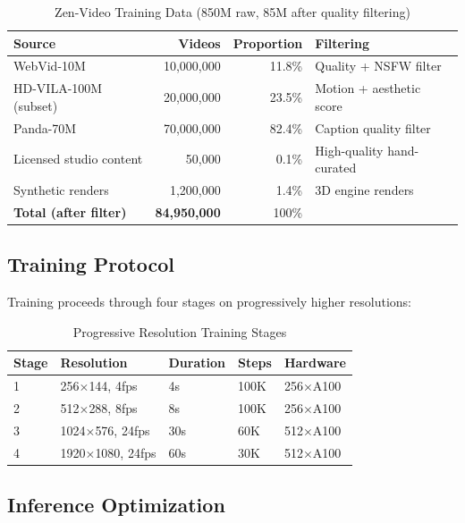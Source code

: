\documentclass[11pt,a4paper]{article}
\begin{document}
\begin{table}[H]
\centering
\begin{tabular}{lrrl}
\toprule
\textbf{Source} & \textbf{Videos} & \textbf{Proportion} & \textbf{Filtering} \\
\midrule
WebVid-10M & 10,000,000 & 11.8\% & Quality + NSFW filter \\
HD-VILA-100M (subset) & 20,000,000 & 23.5\% & Motion + aesthetic score \\
Panda-70M & 70,000,000 & 82.4\% & Caption quality filter \\
Licensed studio content & 50,000 & 0.1\% & High-quality hand-curated \\
Synthetic renders & 1,200,000 & 1.4\% & 3D engine renders \\
\midrule
\textbf{Total (after filter)} & \textbf{84,950,000} & 100\% & \\
\bottomrule
\end{tabular}
\caption{Zen-Video Training Data (850M raw, 85M after quality filtering)}
\end{table}

\subsection{Training Protocol}

Training proceeds through four stages on progressively higher resolutions:

\begin{table}[H]
\centering
\begin{tabular}{lllll}
\toprule
\textbf{Stage} & \textbf{Resolution} & \textbf{Duration} & \textbf{Steps} & \textbf{Hardware} \\
\midrule
1 & 256$\times$144, 4fps & 4s & 100K & 256$\times$A100 \\
2 & 512$\times$288, 8fps & 8s & 100K & 256$\times$A100 \\
3 & 1024$\times$576, 24fps & 30s & 60K & 512$\times$A100 \\
4 & 1920$\times$1080, 24fps & 60s & 30K & 512$\times$A100 \\
\bottomrule
\end{tabular}
\caption{Progressive Resolution Training Stages}
\end{table}

\subsection{Inference Optimization}
\end{document}
